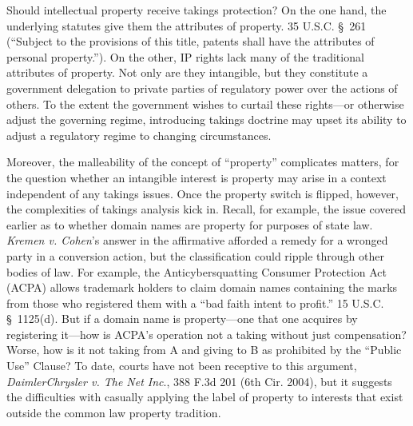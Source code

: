 Should intellectual property receive takings protection? On the one hand, the
underlying statutes give them the attributes of property. 35 U.S.C. \S~261
(``Subject to the provisions of this title, patents shall have the attributes of
personal property.''). On the other, IP rights lack many of the traditional
attributes of property. Not only are they intangible, but they constitute a
government delegation to private parties of regulatory power over the actions of
others. To the extent the government wishes to curtail these rights---or
otherwise adjust the governing regime, introducing takings doctrine may upset
its ability to adjust a regulatory regime to changing circumstances. 


Moreover, the malleability of the concept of ``property'' complicates matters,
for the question whether an intangible interest is property may arise in a
context independent of any takings issues. Once the property switch is flipped,
however, the complexities of takings analysis kick in. Recall, for example, the
issue covered earlier as to whether domain names are property for purposes of
state law. \textit{Kremen v. Cohen}'s answer in the affirmative afforded a
remedy for a wronged party in a conversion action, but the classification could
ripple through other bodies of law. For example, the Anticybersquatting Consumer
Protection Act (ACPA) allows trademark holders to claim domain names containing
the marks from those who registered them with a ``bad faith intent to profit.''
15 U.S.C. \S~1125(d). But if a domain name is property---one that one acquires
by registering it---how is ACPA's operation not a taking without just
compensation? Worse, how is it not taking from A and giving to B as prohibited
by the ``Public Use'' Clause? To date, courts have not been receptive to this
argument, \textit{DaimlerChrysler v. The Net Inc}., 388 F.3d 201 (6th Cir.
2004), but it suggests the difficulties with casually applying the label of
property to interests that exist outside the common law property tradition.

